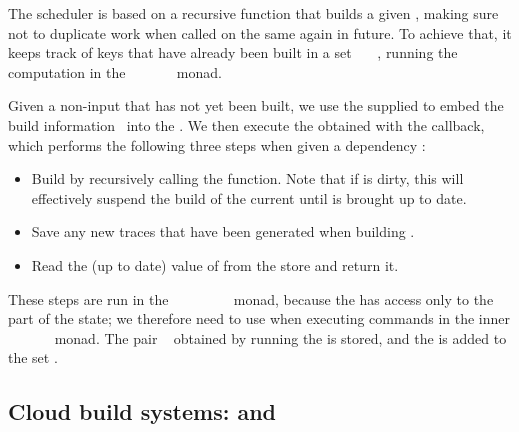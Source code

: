 The  scheduler is based on a recursive function  that
builds a given , making sure not to duplicate work when called on the
same  again in future. To achieve that, it keeps track of keys that have
already been built in a set ~\hs{::}~~, running the
computation in the
~~~~~~ monad.

Given a non-input  that has not yet been built, we use the supplied
 to embed the build information~ into the .
We then execute the obtained  with the  callback, which
performs the following three steps when given a dependency :

\begin{itemize}
    \item Build  by recursively calling the  function. Note
          that if  is dirty, this will effectively suspend the build of
          the current  until  is brought up to date.
    \item Save any new traces that have been generated when building .
    \item Read the (up to date) value of  from the store and return it.
\end{itemize}

These steps are run in the
~~~~~~~~
monad, because the  has access only to the~ part of the state;
we therefore need to use  when executing commands in the inner
~~~~~~ monad.
The pair ~ obtained by running the  is
stored, and the  is added to the set .

\subsection{Cloud build systems: \Bazel and \Cloud \Shake}\label{sec-implementation-bazel-cloud-shake}

